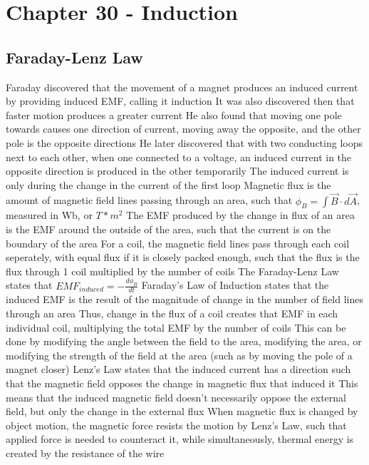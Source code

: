 \documentclass[11 pt, twoside]{article}
\newenvironment{outline*}
{
	\begin{outline}[enumerate]
	}
	{\end{outline}
}
\begin{document}
\section{Chapter 30 - Induction}
\subsection{Faraday-Lenz Law}
\begin{outline*}
\1 Faraday discovered that the movement of a magnet produces an induced current by providing induced EMF, calling it induction
\2 It was also discovered then that faster motion produces a greater current
\3 He also found that moving one pole towards causes one direction of current, moving away the opposite, and the other pole is the opposite directions
\2 He later discovered that with two conducting loops next to each other, when one connected to a voltage, an induced current in the opposite direction is produced in the other temporarily
\3 The induced current is only during the change in the current of the first loop
\1 Magnetic flux is the amount of magnetic field lines passing through an area, such that $\phi_B = \int \vec{B} \cdot d\vec{A}$, measured in Wb, or $T*m^2$
\2 The EMF produced by the change in flux of an area is the EMF around the outside of the area, such that the current is on the boundary of the area
\2 For a coil, the magnetic field lines pass through each coil seperately, with equal flux if it is closely packed enough, such that the flux is the flux through 1 coil multiplied by the number of coils
\1 The Faraday-Lenz Law states that $EMF_{induced} = -\frac{d\phi_B}{dt}$
\2 Faraday's Law of Induction states that the induced EMF is the result of the magnitude of change in the number of field lines through an area
\3 Thus, change in the flux of a coil creates that EMF in each individual coil, multiplying the total EMF by the number of coils
\3 This can be done by modifying the angle between the field to the area, modifying the area, or modifying the strength of the field at the area (such as by moving the pole of a magnet closer)
\2 Lenz's Law states that the induced current has a direction such that the magnetic field opposes the change in magnetic flux that induced it
\3 This means that the induced magnetic field doesn't necessarily oppose the external field, but only the change in the external flux
\1 When magnetic flux is changed by object motion, the magnetic force resists the motion by Lenz's Law, such that applied force is needed to counteract it, while simultaneously, thermal energy is created by the resistance of the wire

\end{outline*}
\end{document}
